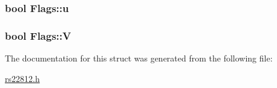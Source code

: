\hypertarget{struct_flags_a61cb6fc897ed9d5b699ed03135057411}{
\subsubsection[{u}]{\setlength{\rightskip}{0pt plus 5cm}bool Flags\-::u}}\label{struct_flags_a61cb6fc897ed9d5b699ed03135057411}
\hypertarget{struct_flags_a9750f152539ef616f76a163bd6009198}{
\subsubsection[{V}]{\setlength{\rightskip}{0pt plus 5cm}bool Flags\-::\-V}}\label{struct_flags_a9750f152539ef616f76a163bd6009198}


The documentation for this struct was generated from the following file\-:\begin{DoxyCompactItemize}
\item 
\hyperlink{rs22812_8h}{rs22812.\-h}\end{DoxyCompactItemize}
